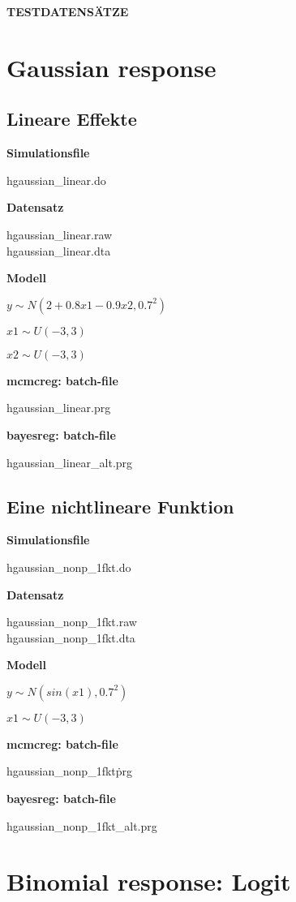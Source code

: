 \documentclass[10pt,a4paper]{article}
\begin{document}
{\bf \Huge TESTDATENS\"{A}TZE}

\tableofcontents

\section{Gaussian response}

\subsection{Lineare Effekte}

{\bf Simulationsfile}

hgaussian\_linear.do

{\bf Datensatz}

hgaussian\_linear.raw \\[0.2cm]
hgaussian\_linear.dta


{\bf Modell}


$y  \sim N(2+0.8 x1 - 0.9 x2 ,0.7^2)$

$x1 \sim U(-3,3)$

$x2 \sim U(-3,3)$

{\bf mcmcreg: batch-file}

hgaussian\_linear.prg

{\bf bayesreg: batch-file}

hgaussian\_linear\_alt.prg



\subsection{Eine nichtlineare Funktion}

{\bf Simulationsfile}

hgaussian\_nonp\_1fkt.do

{\bf Datensatz}

hgaussian\_nonp\_1fkt.raw \\[0.2cm]
hgaussian\_nonp\_1fkt.dta

{\bf Modell}

$y  \sim N(sin(x1),0.7^2)$

$x1 \sim U(-3,3)$

{\bf mcmcreg: batch-file}

hgaussian\_nonp\_1fkt\.prg

{\bf bayesreg: batch-file}

hgaussian\_nonp\_1fkt\_alt.prg



\section{Binomial response: Logit}
\end{document}
